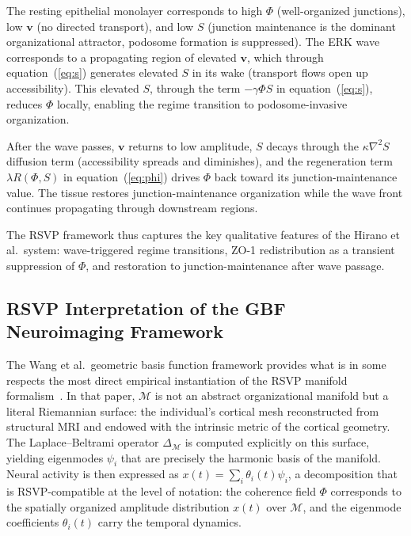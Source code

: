 \documentclass[11pt,a4paper]{article}
\theoremstyle{plain}
\theoremstyle{definition}
\begin{document}
The resting epithelial monolayer corresponds to high $\Phi$ (well-organized junctions),
low $\mathbf{v}$ (no directed transport), and low $S$ (junction maintenance is the dominant
organizational attractor, podosome formation is suppressed). The ERK wave corresponds to
a propagating region of elevated $\mathbf{v}$, which through equation~(\ref{eq:s})
generates elevated $S$ in its wake (transport flows open up accessibility). This elevated
$S$, through the term $-\gamma \Phi S$ in equation~(\ref{eq:s}), reduces $\Phi$ locally,
enabling the regime transition to podosome-invasive organization.

After the wave passes, $\mathbf{v}$ returns to low amplitude, $S$ decays through the
$\kappa \nabla^2 S$ diffusion term (accessibility spreads and diminishes), and the
regeneration term $\lambda R(\Phi, S)$ in equation~(\ref{eq:phi}) drives $\Phi$ back
toward its junction-maintenance value. The tissue restores junction-maintenance
organization while the wave front continues propagating through downstream regions.

The RSVP framework thus captures the key qualitative features of the Hirano et al.\
system: wave-triggered regime transitions, ZO-1 redistribution as a transient suppression
of $\Phi$, and restoration to junction-maintenance after wave passage.

\subsection{RSVP Interpretation of the GBF Neuroimaging Framework}

The Wang et al.\ geometric basis function framework provides what is in some respects
the most direct empirical instantiation of the RSVP manifold formalism~\cite{Wang2026}.
In that paper, $\mathcal{M}$ is not an abstract organizational manifold but a
literal Riemannian surface: the individual's cortical mesh reconstructed from structural
MRI and endowed with the intrinsic metric of the cortical geometry. The Laplace--Beltrami
operator $\Delta_{\mathcal{M}}$ is computed explicitly on this surface, yielding
eigenmodes $\psi_i$ that are precisely the harmonic basis of the manifold. Neural
activity is then expressed as $x(t) = \sum_i \theta_i(t) \psi_i$, a decomposition
that is RSVP-compatible at the level of notation: the coherence field $\Phi$
corresponds to the spatially organized amplitude distribution $x(t)$ over $\mathcal{M}$,
and the eigenmode coefficients $\theta_i(t)$ carry the temporal dynamics.
\end{document}

